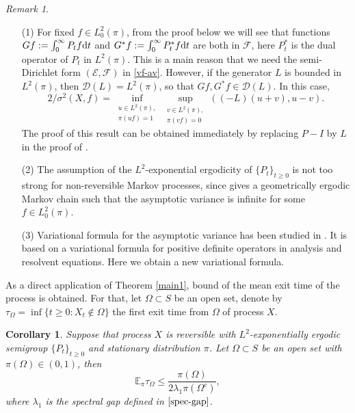 \documentclass[12pt,reqno]{article}
\newtheorem{cor}[thm]{Corollary}
\theoremstyle{definition}
\theoremstyle{remark}
\newtheorem{rem}[thm]{Remark}
\theoremstyle{example}
\numberwithin{equation}{section}
\newcommand{\scr}[1]{\mathscr #1}
\def\d{\mathrm{d}}
\def\e{\scr E}
\def\bE{\mathbb E}
\def\d{\rm d}
\def\lb{\label}
\def\d{{\mbox{\rm d}}}
\begin{document}
\begin{rem}
\begin{itemize}
\item[(1)] For fixed $f\in L^2_0(\pi)$, from the proof below we will see that functions $Gf:=\int_0^\infty P_tf\d t$ and $G^*f:=\int_0^\infty P^*_t f\d t$ are both in $\scr{F}$, here $P^*_t$ is the dual operator of $P_t$ in $L^2(\pi)$. This is a main reason that we need the semi-Dirichlet form $(\e,\scr{F})$ in \eqref{vf-av}. However, if the generator $L$ is bounded in $L^2(\pi)$, then
 $\scr{D}(L)=L^2(\pi)$, so that $Gf,G^*f\in\scr{D}(L)$. In this case,
$$
2/\sigma^2(X,f)=\inf_{\substack{u\in L^2(\pi),\\ \pi(uf)=1}}\sup_{\substack{v\in L^2(\pi),\\ \pi(vf)=0}}((-L)(u+v),u-v).
$$
The proof of this result can be obtained immediately by replacing $P-I$ by $L$ in the proof of \cite[Theorem 1.1]{HM21+}.

\item[(2)] The assumption of the $L^2$-exponential ergodicity of $\{P_t\}_{t\geq0}$ is not too strong for non-reversible Markov processes, since \cite{Ha05} gives a geometrically ergodic Markov chain such that the asymptotic variance is infinite for some $f\in L_0^2(\pi)$.

\item[(3)] Variational formula for the asymptotic variance has been studied in \cite[Chapter 4]{KLO12}. It is based on a variational formula for positive definite operators in analysis and resolvent equations. Here we obtain a new  variational formula.


\end{itemize}
\end{rem}

As a direct application of Theorem \ref{main1}, bound of the mean exit time of the process is obtained. For that, let $\Omega\subset S$ be an open set, denote by $\tau_\Omega=\inf\{t\geq0:X_t\notin\Omega\}$  the first exit time from $\Omega$ of process $X$.


\begin{cor}\lb{exit-time}
Suppose that process $X$ is reversible with $L^2$-exponentially ergodic semigroup $\{P_t\}_{t\geq0}$ and stationary distribution $\pi$. Let $\Omega\subset S$ be an open set with $\pi(\Omega)\in(0,1)$, then
$$
\bE_\pi\tau_\Omega\leq \frac{\pi(\Omega)}{2\lambda_1\pi(\Omega^c)},
$$
 where $\lambda_1$ is the spectral gap defined in $\eqref{spec-gap}$.
\end{cor}
\end{document}
